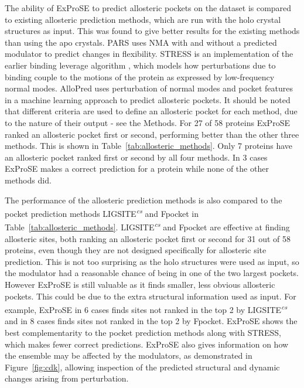 The ability of ExProSE to predict allosteric pockets on the dataset is compared to existing allosteric prediction methods, which are run with the holo crystal structures as input.
This was found to give better results for the existing methods than using the apo crystals.
PARS \cite{Panjkovich2014} uses NMA with and without a predicted modulator to predict changes in flexibility.
STRESS \cite{Clarke2016} is an implementation of the earlier binding leverage algorithm \cite{Mitternacht2011}, which models how perturbations due to binding couple to the motions of the protein as expressed by low-frequency normal modes.
AlloPred \cite{Greener2015} uses perturbation of normal modes and pocket features in a machine learning approach to predict allosteric pockets.
It should be noted that different criteria are used to define an allosteric pocket for each method, due to the nature of their output - see the Methods.
For 27 of 58 proteins ExProSE ranked an allosteric pocket first or second, performing better than the other three methods.
This is shown in Table~\ref{tab:allosteric_methods}.
Only 7 proteins have an allosteric pocket ranked first or second by all four methods.
In 3 cases ExProSE makes a correct prediction for a protein while none of the other methods did.

The performance of the allosteric prediction methods is also compared to the pocket prediction methods LIGSITE\textsuperscript{\it cs} and Fpocket \cite{LeGuilloux2009} in Table~\ref{tab:allosteric_methods}.
LIGSITE\textsuperscript{\it cs} and Fpocket are effective at finding allosteric sites, both ranking an allosteric pocket first or second for 31 out of 58 proteins, even though they are not designed specifically for allosteric site prediction.
This is not too surprising as the holo structures were used as input, so the modulator had a reasonable chance of being in one of the two largest pockets.
However ExProSE is still valuable as it finds smaller, less obvious allosteric pockets.
This could be due to the extra structural information used as input.
For example, ExProSE in 6 cases finds sites not ranked in the top 2 by LIGSITE\textsuperscript{\it cs} and in 8 cases finds sites not ranked in the top 2 by Fpocket.
ExProSE shows the best complementarity to the pocket prediction methods along with STRESS, which makes fewer correct predictions.
ExProSE also gives information on how the ensemble may be affected by the modulators, as demonstrated in Figure~\ref{fig:cdk}, allowing inspection of the predicted structural and dynamic changes arising from perturbation.

